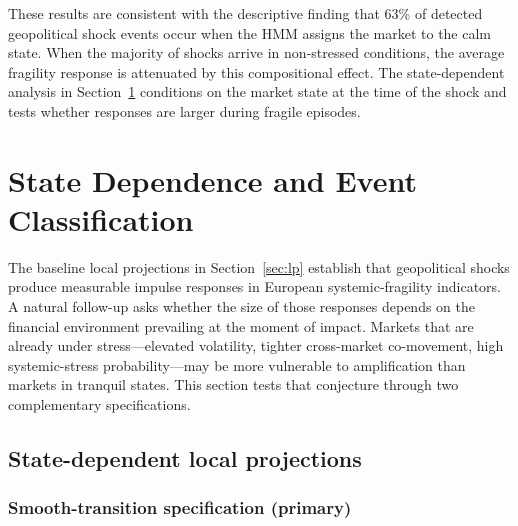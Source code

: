 \documentclass[11pt]{article}
\begin{document}
These results are consistent with the descriptive finding that 63\% of
detected geopolitical shock events occur when the HMM assigns the market
to the calm state.
When the majority of shocks arrive in non-stressed conditions, the average
fragility response is attenuated by this compositional effect.
The state-dependent analysis in Section~\ref{sec:state} conditions on the
market state at the time of the shock and tests whether responses are larger
during fragile episodes.

\section{State Dependence and Event Classification}
\label{sec:state}

The baseline local projections in Section~\ref{sec:lp} establish that
geopolitical shocks produce measurable impulse responses in European
systemic-fragility indicators. A natural follow-up asks whether the size
of those responses depends on the financial environment prevailing at the
moment of impact. Markets that are already under stress---elevated
volatility, tighter cross-market co-movement, high systemic-stress
probability---may be more vulnerable to amplification than markets in
tranquil states. This section tests that conjecture through two
complementary specifications.

\subsection{State-dependent local projections}
\label{sec:state_lp}


\subsubsection{Smooth-transition specification (primary)}
\label{sec:smooth_lp}
\end{document}
